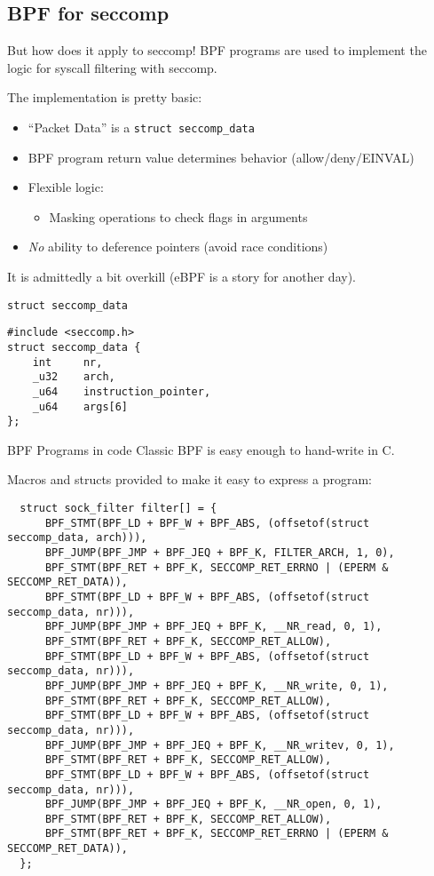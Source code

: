 \documentclass[handout]{beamer}
\begin{document}
\subsection{BPF for seccomp}
\begin{frame}{But how does it apply to seccomp!}
BPF programs are used to implement the logic for syscall filtering with seccomp.
\pause

The implementation is pretty basic:
\begin{itemize}
 \item ``Packet Data'' is a \texttt{struct seccomp\_data}
 \item BPF program return value determines behavior (allow/deny/EINVAL)
 \item Flexible logic:
 \begin{itemize}
  \item Masking operations to check flags in arguments
 \end{itemize}
  \item \textit{No} ability to deference pointers (avoid race conditions)
\end{itemize}

\pause
It is admittedly a bit overkill (eBPF is a story for another day).
\end{frame}

\begin{frame}[fragile]{\texttt{struct seccomp\_data}}
\begin{verbatim}
#include <seccomp.h>
struct seccomp_data {
    int     nr,                
    _u32    arch,           
    _u64    instruction_pointer,
    _u64    args[6]
};
\end{verbatim}

\end{frame}
\begin{frame}[fragile]{BPF Programs in code}
Classic BPF is easy enough to hand-write in C.

Macros and structs provided to make it easy to express a program:
 \begin{lstlisting}
  struct sock_filter filter[] = {
      BPF_STMT(BPF_LD + BPF_W + BPF_ABS, (offsetof(struct seccomp_data, arch))),
      BPF_JUMP(BPF_JMP + BPF_JEQ + BPF_K, FILTER_ARCH, 1, 0),
      BPF_STMT(BPF_RET + BPF_K, SECCOMP_RET_ERRNO | (EPERM & SECCOMP_RET_DATA)),
      BPF_STMT(BPF_LD + BPF_W + BPF_ABS, (offsetof(struct seccomp_data, nr))),
      BPF_JUMP(BPF_JMP + BPF_JEQ + BPF_K, __NR_read, 0, 1),
      BPF_STMT(BPF_RET + BPF_K, SECCOMP_RET_ALLOW),
      BPF_STMT(BPF_LD + BPF_W + BPF_ABS, (offsetof(struct seccomp_data, nr))),
      BPF_JUMP(BPF_JMP + BPF_JEQ + BPF_K, __NR_write, 0, 1),
      BPF_STMT(BPF_RET + BPF_K, SECCOMP_RET_ALLOW),
      BPF_STMT(BPF_LD + BPF_W + BPF_ABS, (offsetof(struct seccomp_data, nr))),
      BPF_JUMP(BPF_JMP + BPF_JEQ + BPF_K, __NR_writev, 0, 1),
      BPF_STMT(BPF_RET + BPF_K, SECCOMP_RET_ALLOW),
      BPF_STMT(BPF_LD + BPF_W + BPF_ABS, (offsetof(struct seccomp_data, nr))),
      BPF_JUMP(BPF_JMP + BPF_JEQ + BPF_K, __NR_open, 0, 1),
      BPF_STMT(BPF_RET + BPF_K, SECCOMP_RET_ALLOW),
      BPF_STMT(BPF_RET + BPF_K, SECCOMP_RET_ERRNO | (EPERM & SECCOMP_RET_DATA)),
  };
 \end{lstlisting}
\end{frame}
\end{document}
